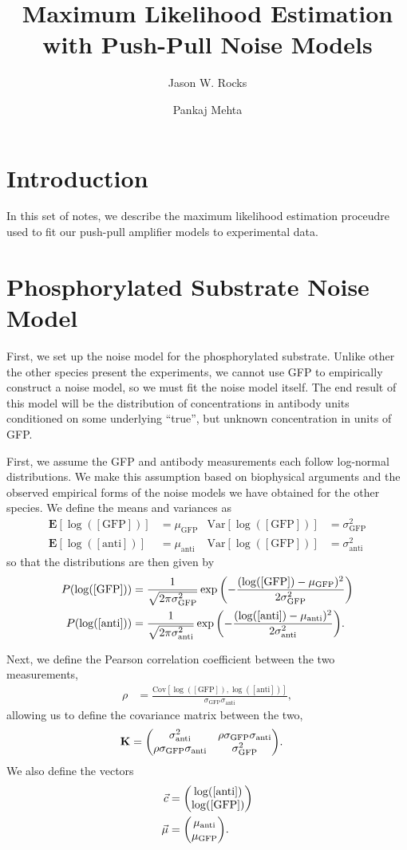 \documentclass[aps,onecolumn,superscriptaddress,notitlepage]{revtex4-1}
\newcommand{\sigmaGFP}{\sigma_{\mathrm{GFP}}}
\newcommand{\sigmaanti}{\sigma_{\mathrm{anti}}}
\newcommand{\muGFP}{\mu_{\mathrm{GFP}}}
\newcommand{\muanti}{\mu_{\mathrm{anti}}}
\newcommand{\lGFP}{\log([\mathrm{GFP}])}
\newcommand{\lanti}{\log([\mathrm{anti}])}
\newcommand{\E}{\mathbf{E}}
\newcommand{\Var}{\mathrm{Var}}
\newcommand{\Cov}{\mathrm{Cov}}
\begin{document}
\title{Maximum Likelihood Estimation with Push-Pull Noise Models}
\author{Jason W. Rocks}
\author{Pankaj Mehta}
\maketitle

\section{Introduction}
In this set of notes, we describe the maximum likelihood estimation proceudre used to fit our push-pull amplifier models to experimental data.

\section{Phosphorylated Substrate Noise Model}

First, we set up the noise model for the phosphorylated substrate.
Unlike other the other species present the experiments,
we cannot use GFP to empirically construct a noise model,
so we must fit the noise model itself.
The end result of this model will be the distribution of concentrations in antibody units conditioned on some underlying ``true'', but unknown concentration in units of GFP.

First, we assume the GFP and antibody measurements each follow log-normal distributions. 
We make this assumption based on biophysical arguments and the observed empirical forms of the noise models we have obtained for the other species.  
We define the means and variances as
\begin{align}
\E[\lGFP] &= \muGFP & \Var[\lGFP] &= \sigmaGFP^2\\ 
\E[\lanti] &= \muanti & \Var[\lGFP]&= \sigmaanti^2
\end{align}
so that the distributions are then given by
\begin{align}
P(\lGFP) &= \frac{1}{\sqrt{2\pi\sigmaGFP^2 }}\exp\qty(-\frac{(\lGFP-\muGFP)^2}{2\sigmaGFP^2})\\
P(\lanti) &= \frac{1}{\sqrt{2\pi\sigmaanti^2 }}\exp\qty(-\frac{(\lanti-\muanti)^2}{2\sigmaanti^2}).
\end{align}

Next, we define the Pearson correlation coefficient between the two measurements,
\begin{align}
\rho &= \frac{\Cov[\lGFP, \lanti]}{\sigmaGFP\sigmaanti},
\end{align}
allowing us to define the covariance matrix between the two,
\begin{align}
\mathbf{K} &= \mqty(\sigmaanti^2 & \rho \sigmaGFP\sigmaanti\\
\rho \sigmaGFP\sigmaanti &  \sigmaGFP^2).
\end{align}
We also define the vectors
\begin{align}
\vec{c} &= \mqty(\lanti \\ \lGFP)\\
\vec{\mu} &= \mqty(\muanti \\\muGFP).
\end{align}
\end{document}
